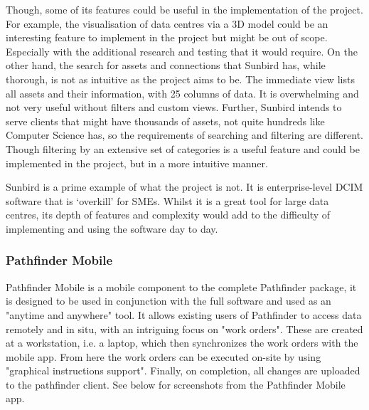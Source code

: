 \documentclass [11pt,a4paper]{article}
\begin{document}
Though, some of its features could be useful in the implementation of the project. For example, the visualisation of data centres via a 3D model could be an interesting feature to implement in the project but might be out of scope. Especially with the additional research and testing that it would require. On the other hand, the search for assets and connections that Sunbird has, while thorough, is not as intuitive as the project aims to be. The immediate view lists all assets and their information, with 25 columns of data. It is overwhelming and not very useful without filters and custom views. Further, Sunbird intends to serve clients that might have thousands of assets, not quite hundreds like Computer Science has, so the requirements of searching and filtering are different. Though filtering by an extensive set of categories is a useful feature and could be implemented in the project, but in a more intuitive manner. 


Sunbird is a prime example of what the project is not. It is enterprise-level DCIM software that is `overkill' for SMEs. Whilst it is a great tool for large data centres, its depth of features and complexity would add to the difficulty of implementing and using the software day to day.

\subsubsection{Pathfinder Mobile}
\label{sec:pathfinder}

Pathfinder Mobile is a mobile component to the complete Pathfinder package, it is designed to be used in conjunction with the full software and used as an "anytime and anywhere" \cite{PathfinderMobile} tool. It allows existing users of Pathfinder to access data remotely and in situ, with an intriguing focus on "work orders". These are created at a workstation, i.e. a laptop, which then synchronizes the work orders with the mobile app. From here the work orders can be executed on-site by using "graphical instructions support"\cite{Pathfinder}. Finally, on completion, all changes are uploaded to the pathfinder client. See below for screenshots from the Pathfinder Mobile app. 
\end{document}
